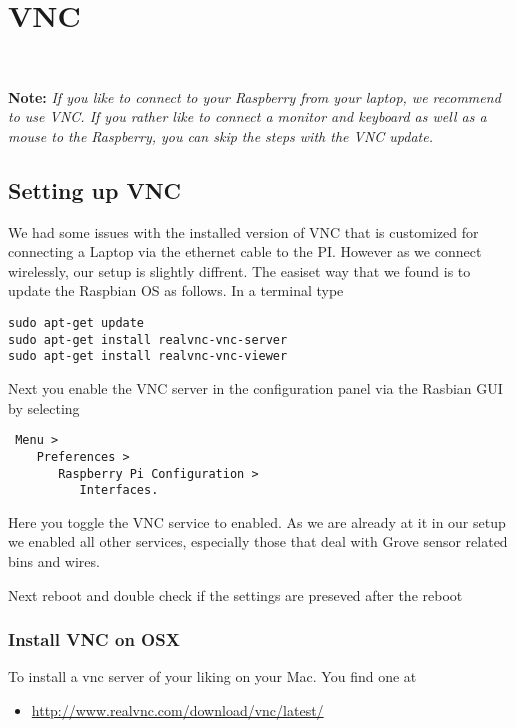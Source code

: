 

\chapter{VNC}\label{vnc}

\FILENAME\

\textbf{Note:} \emph{If you like to connect to your Raspberry from your
laptop, we recommend to use VNC. If you rather like to connect a monitor
and keyboard as well as a mouse to the Raspberry, you can skip the steps
with the VNC update.}

\section{Setting up VNC}\label{setting-up-vnc}

We had some issues with the installed version of VNC that is customized
for connecting a Laptop via the ethernet cable to the PI. However as we
connect wirelessly, our setup is slightly diffrent. The easiset way that
we found is to update the Raspbian OS as follows. In a terminal type

\begin{verbatim}
sudo apt-get update
sudo apt-get install realvnc-vnc-server 
sudo apt-get install realvnc-vnc-viewer
\end{verbatim}

Next you enable the VNC server in the configuration panel via the
Rasbian GUI by selecting

\begin{verbatim}
 Menu > 
    Preferences > 
       Raspberry Pi Configuration > 
          Interfaces.
\end{verbatim}

Here you toggle the VNC service to enabled. As we are already at it in
our setup we enabled all other services, especially those that deal with
Grove sensor related bins and wires.

Next reboot and double check if the settings are preseved after the
reboot

\subsection{Install VNC on OSX}\label{install-vnc-on-osx}

To install a vnc server of your liking on your Mac. You find one at

\begin{itemize}

\item
  \href{http://www.realvnc.com/download/vnc/latest/\%5D}{http://www.realvnc.com/download/vnc/latest/}
\end{itemize}

